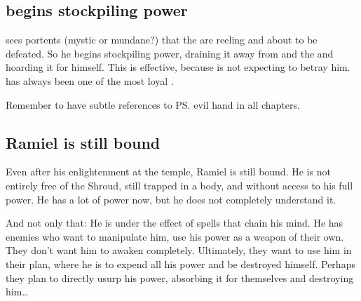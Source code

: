 






\subsection{\Azraid{} begins stockpiling \Erebean{} power}
\Azraid{} sees portents (mystic or mundane?) that the \banes{} are reeling and about to be defeated. So he begins stockpiling \Erebean{} power, draining it away from \Erebos{} and the \banelords{} and hoarding it for himself. This is effective, because \Daggerrain{} is not expecting \Azraid{} to betray him. \Azraid{} has always been one of the most loyal \resphain. 

Remember to have subtle references to \ps{\Azraid} evil hand in all \Azraid{} chapters. 







\subsection{Ramiel is still bound}
Even after his enlightenment at the \Mystraacht{} temple, Ramiel is still bound. He is not entirely free of the Shroud, still trapped in a \human{} body, and without access to his full \sathariah{} power. He has a lot of power now, but he does not completely understand it. 

And not only that: He is under the effect of spells that chain his mind. He has enemies who want to manipulate him, use his power as a weapon of their own. They don't want him to awaken completely. Ultimately, they want to use him in their plan, where he is to expend all his power and be destroyed himself. Perhaps they plan to directly usurp his power, absorbing it for themselves and destroying him\ldots{}

